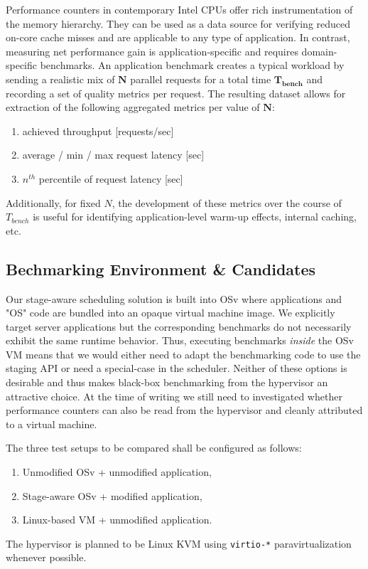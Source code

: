 \documentclass{article}
\begin{document}
Performance counters in contemporary Intel CPUs offer rich instrumentation of the memory hierarchy. They can be used as a
data source for verifying reduced on-core cache misses and are applicable to any type of application.
In contrast, measuring net performance gain is application-specific and requires domain-specific benchmarks.
An application benchmark creates a typical workload by sending a realistic mix of $\mathbf{N}$ parallel requests for a
total time $\mathbf{T_{bench}}$ and recording a set of quality metrics per request.
The resulting dataset allows for extraction of the following aggregated metrics per value of $\mathbf{N}$:
\begin{enumerate}[label=\emph{(\alph*)}]
    \item achieved throughput [requests/sec]
    \item average / min / max request latency [sec]
    \item $n^{th}$ percentile of request latency [sec]
\end{enumerate}
Additionally, for fixed $N$, the development of these metrics over the course of $T_{bench}$ is useful for identifying
application-level warm-up effects, internal caching, etc.


\subsection{Bechmarking Environment \& Candidates}\label{environment}

Our stage-aware scheduling solution is built into OSv where applications and "OS" code are bundled into an opaque virtual
machine image.
We explicitly target server applications but the corresponding benchmarks do not necessarily exhibit the same runtime
behavior.
Thus, executing benchmarks \emph{inside} the OSv VM means that we would either need to adapt the benchmarking code to
use the staging API or need a special-case in the scheduler.
Neither of these options is desirable and thus makes black-box benchmarking from the hypervisor an attractive choice.
At the time of writing we still need to investigated whether performance counters can also be read from the hypervisor
and cleanly attributed to a virtual machine.

The three test setups to be compared shall be configured as follows:
\begin{enumerate}
    \item Unmodified OSv + unmodified application,
    \item Stage-aware OSv + modified application,
    \item \label{linuxvmsetup} Linux-based VM + unmodified application.
\end{enumerate}
The hypervisor is planned to be Linux KVM using \texttt{virtio-*} paravirtualization whenever possible.
\end{document}
